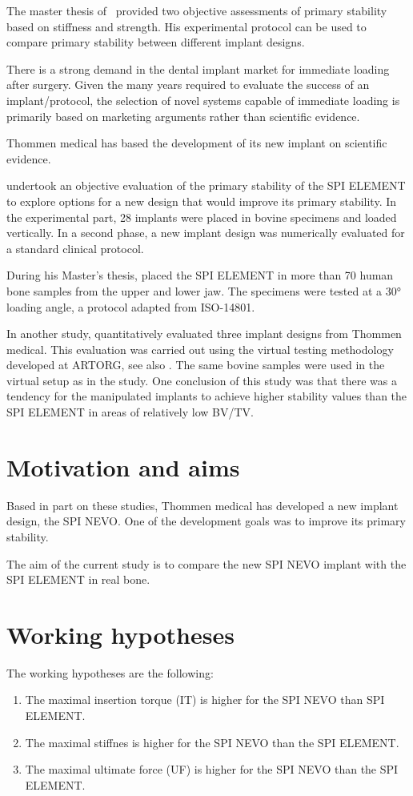 \documentclass[12pt, a4paper, twoside]{report}
\begin{document}
The master thesis of~\citet{voumard_peroperative_2019} provided two objective assessments of primary stability based on stiffness and strength.
His experimental protocol can be used to compare primary stability between different implant designs.

There is a strong demand in the dental implant market for immediate loading after surgery.
Given the many years required to evaluate the success of an implant/protocol, the selection of novel systems capable of immediate loading is primarily based on marketing arguments rather than scientific evidence.

Thommen medical has based the development of its new implant on scientific evidence.

\cite{wili_experimental_2021} undertook an objective evaluation of the primary stability of the SPI ELEMENT to explore options for a new design that would improve its primary stability.
In the experimental part, 28 implants were placed in bovine specimens and loaded vertically.
In a second phase, a new implant design was numerically evaluated for a standard clinical protocol.

During his Master's thesis, \citet{thierrin_primary_2022} placed the SPI ELEMENT in more than 70 human bone samples from the upper and lower jaw.
The specimens were tested at a 30° loading angle, a protocol adapted from ISO-14801.

In another study, \citet{wili_virtual_2022} quantitatively evaluated three implant designs from Thommen medical.
This evaluation was carried out using the virtual testing methodology developed at ARTORG, see also \cite{wili_experimental_2021}.
The same bovine samples were used in the virtual setup as in the \cite{wili_experimental_2021} study.
One conclusion of this study was that there was a tendency for the manipulated implants to achieve higher stability values than the SPI ELEMENT in areas of relatively low BV/TV.


\section{Motivation and aims}
%
Based in part on these studies, Thommen medical has developed a new implant design, the SPI NEVO.
One of the development goals was to improve its primary stability.

The aim of the current study is to compare the new SPI NEVO implant with the SPI ELEMENT in real bone.

%
%
%
\section{Working hypotheses}
%
The working hypotheses are the following:
\begin{enumerate}
\item The maximal insertion torque (IT) is higher for the SPI NEVO than SPI ELEMENT.
\item The maximal stiffnes is higher for the SPI NEVO than the SPI ELEMENT.
\item The maximal ultimate force (UF) is higher for the SPI NEVO than the SPI ELEMENT.
\end{enumerate}
\end{document}
